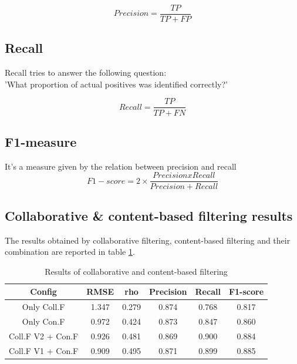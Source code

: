 \documentclass{article}
\begin{document}
\begin{equation}
      Precision = \frac{TP}{TP + FP}
\end{equation}
\subsection{Recall}
Recall tries to answer the following question:\\
'What proportion of actual positives was identified correctly?'

\begin{equation}
      Recall = \frac{TP}{TP + FN}
\end{equation}

\subsection{F1-measure}
It's a measure given by the relation between precision and recall
\begin{equation}
    F1-score = 2 \times \frac{Precision x Recall}{Precision + Recall}
\end{equation}

\subsection{Collaborative \& content-based filtering results}

The results obtained by collaborative filtering, content-based filtering and their combination are reported in table \ref{FilteringResults}.

\begin{table}[h]
      \begin{tabular}{ | c | c | c | c | c | c |} 
        \hline
        \rowcolor{lightgray} Config & RMSE & rho & Precision & Recall & F1-score \\ 
        \hline
         \cellcolor{lightgray} Only Coll.F & 1.347 & 0.279 & 0.874 & 0.768 & 0.817 \\ 
        \hline
        \cellcolor{lightgray} Only Con.F & 0.972 & 0.424 & 0.873 & 0.847 & 0.860 \\ 
        \hline
        \cellcolor{lightgray}Coll.F V2 + Con.F & 0.926 & 0.481 & 0.869 & 0.900 & 0.884\\
        \hline
        \cellcolor{lightgray}Coll.F V1 + Con.F & 0.909 & 0.495 & 0.871 & 0.899 & 0.885\\
        \hline
      \end{tabular}
    \caption{Results of collaborative and content-based filtering}
    \label{FilteringResults}
\end{table}
\end{document}
